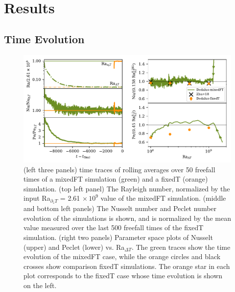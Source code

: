 \documentclass[aps, pre, onecolumn, nofootinbib, notitlepage, groupedaddress, amsfonts, amssymb, amsmath, longbibliography]{revtex4-1}
\begin{document}
\section{Results}
\label{sec:results}

\subsection{Time Evolution}
\label{sec:2d_results}

\begin{figure}
\includegraphics[width=\textwidth]{./figs/rbc_scalar_comparisons.pdf}
\caption{ 
	(left three panels) time traces of rolling averages over 50 freefall times of a mixedFT simulation (green) and a fixedT (orange) simulation.
	(top left panel) The Rayleigh number, normalized by the input Ra$_{\partial_z T}$ = 2.61$\,\times 10^9$ value of the mixedFT simulation.
	(middle and bottom left panels) The Nusselt number and Peclet number evolution of the simulations is shown, and is normalized by the mean value measured over the last 500 freefall times of the fixedT simulation.
	(right two panels) Parameter space plots of Nusselt (upper) and Peclet (lower) vs. Ra$_{\Delta T}$.
	The green traces show the time evolution of the mixedFT case, while the orange circles and black crosses show comparison fixedT simulations.
	The orange star in each plot corresponds to the fixedT case whose time evolution is shown on the left.
\label{fig:rbc_scalar_comparisons} }
\end{figure}
\end{document}
